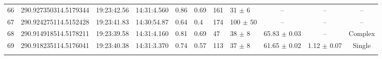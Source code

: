 \begin{table}[htbp!]
\begin{tabular}{llllllllccc}
66  &  290.927350314.5179344  &  19:23:42.56  &  14:31:4.560  &  0.86  &  0.69  &  161  &  31 $\pm$ 6  &  --  &  --  &  -- \\
67  &  290.924275114.5152428  &  19:23:41.83  &  14:30:54.87  &  0.64  &  0.4  &  174  &  100 $\pm$ 50  &  --  &  --  &  -- \\
68  &  290.914918514.5178211  &  19:23:39.58  &  14:31:4.160  &  0.81  &  0.69  &  47  &  38 $\pm$ 8  &  65.83 $\pm$ 0.03  &  --  &  Complex \\
69  &  290.918235114.5176041  &  19:23:40.38  &  14:31:3.370  &  0.74  &  0.57  &  113  &  37 $\pm$ 8  &  61.65 $\pm$ 0.02  &  1.12 $\pm$ 0.07  &  Single \\
\hline \noalign {\smallskip}
\end{tabular}
\end{table}



